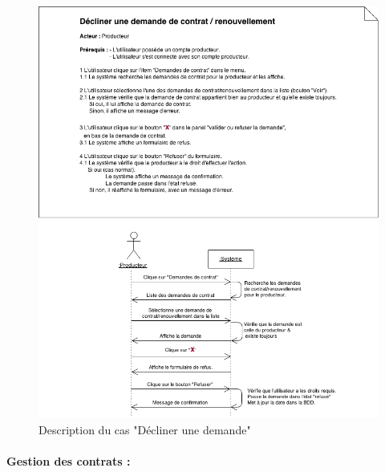 \documentclass[12pt]{report}
\begin{document}
\begin{figure}[!h]
\centering
\includegraphics[width=1.\textwidth]{./ressources/desc_UC_decliner_demande.png}
\caption{Description du cas "Décliner une demande"}
\end{figure}
\clearpage

\paragraph*{Gestion des contrats :}
\end{document}
